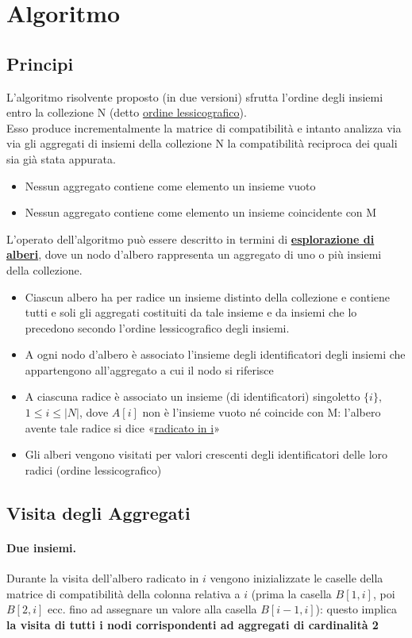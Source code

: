 \section{Algoritmo}
\subsection{Principi}
L’algoritmo risolvente proposto (in due versioni) sfrutta l’ordine degli insiemi entro la collezione N (detto \underline{ordine lessicografico}).\\
Esso produce incrementalmente la matrice di compatibilità e intanto analizza via via gli aggregati di insiemi della collezione N la compatibilità reciproca dei quali sia già stata appurata.
\begin{itemize}
    \item Nessun aggregato contiene come elemento un insieme vuoto
    \item Nessun aggregato contiene come elemento un insieme coincidente con M
\end{itemize}
L’operato dell’algoritmo può essere descritto in termini di \underline{\textbf{esplorazione di alberi}}, dove un nodo d’albero rappresenta un aggregato di uno o più insiemi della collezione.
\begin{itemize}
    \item Ciascun albero ha per radice un insieme distinto della collezione e contiene tutti e soli gli aggregati costituiti da tale insieme e da insiemi che lo precedono secondo l’ordine lessicografico degli insiemi.
    \item A ogni nodo d’albero è associato l’insieme degli identificatori degli insiemi che appartengono all’aggregato a cui il nodo si riferisce
    \item A ciascuna radice è associato un insieme (di identificatori) singoletto $\{i\}$, $1 \leq i \leq |N|$, dove $A[i]$ non è l’insieme vuoto né coincide con M: l’albero avente tale radice si dice «\underline{radicato in i}»
    \item Gli alberi vengono visitati per valori crescenti degli identificatori delle loro radici (ordine lessicografico)
\end{itemize}

\subsection{Visita degli Aggregati}
\paragraph{Due insiemi.}
Durante la visita dell’albero radicato in $i$ vengono inizializzate le caselle della matrice di compatibilità della colonna relativa a $i$ (prima la casella $B[1,i]$, poi $B[2,i]$ ecc. fino ad assegnare un valore alla casella $B[i-1,i]$): questo implica \textbf{la visita di tutti i nodi corrispondenti ad aggregati di cardinalità 2}
